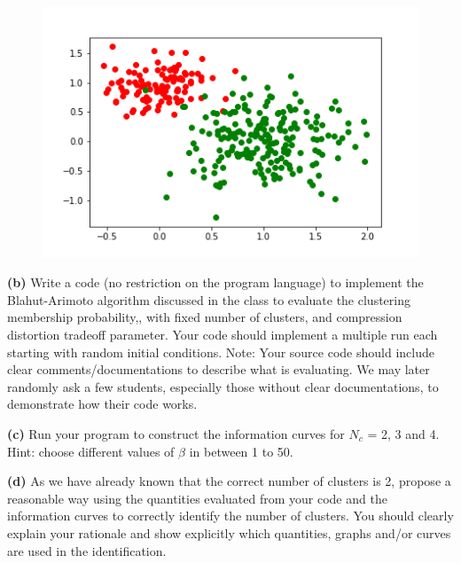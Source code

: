 \documentclass[11pt]{article}
\begin{document}
\begin{figure}[h]
	\includegraphics[width=\linewidth]{scatter_plot_clusters_diff.png}
\end{figure}


\pagebreak

\begin{tcolorbox}
\textbf{(b)}
Write a code (no restriction on the program language) to implement
the Blahut-Arimoto algorithm discussed in the class to evaluate the clustering
membership probability,, with fixed number of clusters, and compression distortion tradeoff parameter. Your code should implement a multiple run each
starting with random initial conditions. Note: Your source code should include clear
comments/documentations to describe what is evaluating. We may later randomly ask
a few students, especially those without clear documentations, to demonstrate how
their code works.
\end{tcolorbox}
\pagebreak

\begin{tcolorbox}
\textbf{(c)}
Run your program to construct the information curves for $N_{c}$ = 2, 3 and
4. Hint: choose different values of $\beta$ in between 1 to 50.
\end{tcolorbox}
\pagebreak

\begin{tcolorbox}
\textbf{(d)}
As we have already known that the correct number of clusters is 2,
propose a reasonable way using the quantities evaluated from your code and the information curves to correctly identify the number of clusters. You should clearly explain your rationale and show explicitly which quantities, graphs and/or curves are used in the
identification.
\end{tcolorbox}
\end{document}

